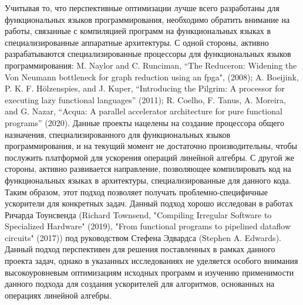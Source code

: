 \documentclass[12pt]{article}  %
\theoremstyle{remark}
\begin{document}
Учитывая то, что перспективные оптимизации лучше всего разработаны для функциональных языков программирования, необходимо обратить внимание на работы, связанные с компиляцией программ на функциональных языках в специализированные аппаратные архитектуры. С одной стороны, активно разрабатываются специализированные процессоры для функциональных языков программирования: M. Naylor and C. Runciman, “The Reduceron: Widening the Von Neumann bottleneck for graph reduction using an fpga", (2008); A. Boeijink, P. K. F. Hölzenspies, and J. Kuper, “Introducing the Pilgrim: A processor for executing lazy functional languages” (2011); R. Coelho, F. Tanus, A. Moreira, and G. Nazar, “Acqua: A parallel accelerator architecture for pure functional programs” (2020). Данные проекты нацелены на создание процессора общего назначения, специализированного для функциональных языков программирования, и на текущий момент не достаточно производительны, чтобы послужить платформой для ускорения операций линейной алгебры. С другой же стороны, активно развивается направление, позволяющее компилировать код на функциональных языках в архитектуры, специализированные для данного кода. Таким образом, этот подход позволяет получать проблемно-специфичные ускорители для конкретных задач. Данный подход хорошо исследован в работах Ричарда Тоунсвенда (Richard Townsend, "Compiling Irregular Software to Specialized Hardware" (2019), "From functional programs to pipelined dataflow circuits" (2017)) под руководством Стефена Эдвардса (Stephen A. Edwards). Данный подход перспективен для решения поставленных в рамках данного проекта задач, однако в указанных исследованиях не уделяется особого внимания высокоуровневым оптимизациям исходных программ и изучению применимости данного подхода для создания ускорителей для алгоритмов, основанных на операциях линейной алгебры.
\end{document}
